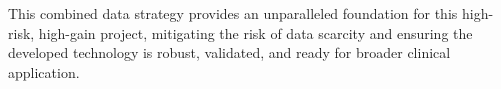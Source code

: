 \documentclass[11pt, a4paper]{article}
\begin{document}

This combined data strategy provides an unparalleled foundation for this high-risk, high-gain project, mitigating the risk of data scarcity and ensuring the developed technology is robust, validated, and ready for broader clinical application.
\end{document}
